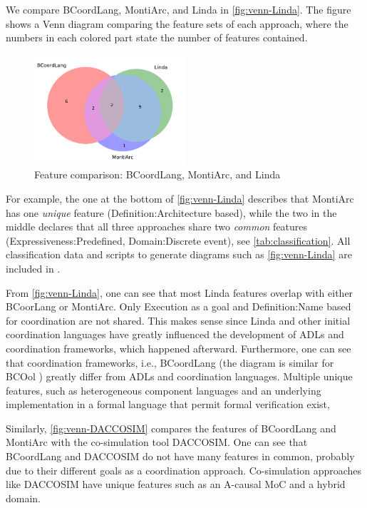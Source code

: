 \documentclass[runningheads]{llncs}
\begin{document}
We compare BCoordLang, MontiArc, and Linda in \autoref{fig:venn-Linda}.
The figure shows a Venn diagram comparing the feature sets of each approach, where the numbers in each colored part state the number of features contained.

\begin{figure}[ht]
	\centering
	\includegraphics[width=0.5\textwidth]{images/venn_linda}
	\caption{Feature comparison: BCoordLang, MontiArc, and Linda}
	\label{fig:venn-Linda}
\end{figure}

For example, the one at the bottom of \autoref{fig:venn-Linda} describes that MontiArc has one \textit{unique} feature (\textsf{Definition:Architecture based}), while the two in the middle declares that all three approaches share two \textit{common} features (\textsf{Expressiveness:Predefined, Domain:Discrete event}), see \autoref{tab:classification}.
All classification data and scripts to generate diagrams such as \autoref{fig:venn-Linda} are included in \cite{timkrauterArtifactsCoordination2024}.

From \autoref{fig:venn-Linda}, one can see that most Linda features overlap with either BCoorLang or MontiArc.
Only \textsf{Execution} as a goal and \textsf{Definition:Name based} for coordination are not shared.
This makes sense since Linda and other initial coordination languages have greatly influenced the development of ADLs and coordination frameworks, which happened afterward.
Furthermore, one can see that coordination frameworks, i.e., BCoordLang (the diagram is similar for BCOol \cite{varalarsenBehavioralCoordinationOperator2015,varalarsenBCOolBehavioralCoordination2016}) greatly differ from ADLs and coordination languages.
Multiple unique features, such as heterogeneous component languages and an underlying implementation in a formal language that permit formal verification exist,


Similarly, \autoref{fig:venn-DACCOSIM} compares the features of BCoordLang and MontiArc with the co-simulation tool DACCOSIM.
One can see that BCoordLang and DACCOSIM do not have many features in common, probably due to their different goals as a coordination approach.
Co-simulation approaches like DACCOSIM have unique features such as an A-causal MoC and a hybrid domain.
\end{document}
